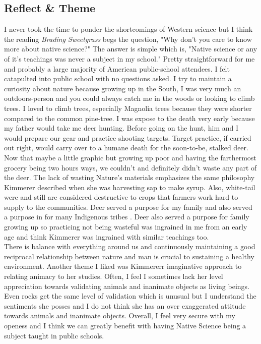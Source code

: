 \documentclass[a4paper,man,biblatex]{apa6}
\begin{document}
\subsection{Reflect \& Theme} I never took the time to ponder the shortcomings of Western science but I think the reading \textit{Brading Sweetgrass} begs the question, "Why don’t you care to know more about  native science?" The answer is simple which is, "Native science or any of it’s teachings was never a subject in my school." Pretty straightforward for me and probably a large majority of American public-school attendees. I felt catapulted into public school with no questions asked. I try to maintain a curiosity about nature because growing up in the South, I was very much an outdoors-person and you could always catch me in the woods or looking to climb trees. I loved to climb trees, especially Magnolia trees because they were shorter compared to the common pine-tree. I was expose to the death very early because my father would take me deer hunting. Before going on the hunt, him and I would prepare our gear and practice shooting targets. Target practice, if carried out right, would carry over to a humane death for the soon-to-be, stalked deer. Now that maybe a little graphic but growing up poor and having the farthermost grocery being two hours ways, we couldn’t and definitely didn’t waste any part of the deer. The lack of wasting Nature’s materials emphasizes the same philosophy Kimmerer described when she was harvesting sap to make syrup. Also, white-tail were and still are considered destructive to crops that farmers work hard to supply to the communities. Deer served a purpose for my family and also served a purpose in for many Indigenous tribes \autocite{nativedeer}. Deer also served a purpose for family growing up so practicing not being wasteful was ingrained in me from an early age and think Kimmerer was ingrained with similar teachings too.\\ There is balance with everything around us and continuously maintaining a good reciprocal relationship between nature and man is crucial to sustaining a healthy environment. Another theme I liked was Kimmererr imaginative approach to relating animacy to her studies. Often, I feel I sometimes lack her level appreciation towards validating animals and inanimate objects as living beings. Even rocks get the same level of validation which is unusual but I understand the sentiments she posses and I do not think she has an over exaggerated attitude towards animals and inanimate objects. Overall, I feel very secure with my openess and I think we can greatly benefit with having Native Science being a subject taught in public schools. 
\end{document}
